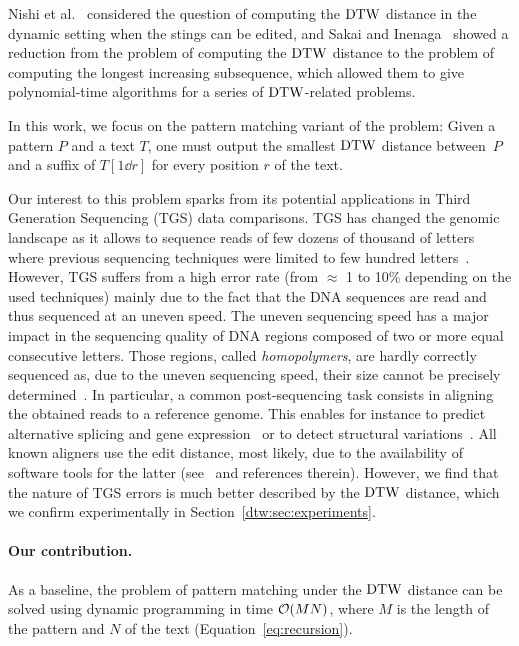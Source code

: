 Nishi et al.~\cite{DBLP:conf/spire/NishiNIBT20} considered the question of computing the $\mathrm{DTW}$ distance in the dynamic setting when the stings can be edited, and Sakai and Inenaga~\cite{DBLP:conf/isaac/SakaiI20} showed a reduction from the problem of computing the $\mathrm{DTW}$ distance to the problem of computing the longest increasing subsequence, which allowed them to give polynomial-time algorithms for a series of $\mathrm{DTW}$-related problems. 

In this work, we focus on the pattern matching variant of the problem: Given a pattern $P$ and a text $T$, one must output the smallest $\mathrm{DTW}$ distance between~$P$ and a suffix of $T[1 \dd r]$ for every position $r$ of the text. 

Our interest to this problem sparks from its potential applications in Third Generation Sequencing (TGS) data comparisons. TGS has changed the genomic landscape as it allows to sequence reads of few dozens of thousand of letters where previous sequencing techniques were limited to few hundred letters~\cite{amarasinghe2020opportunities}. However, TGS suffers from a high error rate (from $\approx$ 1 to 10\% depending on the used techniques) mainly due to the fact that the DNA sequences are read and thus sequenced at an uneven speed. The uneven sequencing speed has a major impact in the sequencing quality of DNA regions composed of two or more equal consecutive letters. Those regions, called \emph{homopolymers}, are hardly correctly sequenced as, due to the uneven sequencing speed, their size cannot be precisely determined~\cite{huang_homopolish_2021}. In particular, a common post-sequencing task  consists in aligning the obtained reads to a reference genome. This enables for instance to predict alternative splicing and gene expression~\cite{gonzalez2016introduction} or to detect structural variations~\cite{mahmoud2019structural}. All known aligners use the edit distance, most likely, due to the availability of software tools for the latter (see~\cite{10.1093/bioinformatics/bty191} and references therein). However, we find that the nature of TGS errors is much better described by the $\mathrm{DTW}$ distance, which we confirm experimentally in Section~\ref{dtw:sec:experiments}.

\paragraph{Our contribution.}  As a baseline, the problem of pattern matching under the $\mathrm{DTW}$ distance can be solved using dynamic programming in time $\mathcal{O}(MN)$, where $M$ is the length of the pattern and $N$ of the text (Equation~\ref{eq:recursion}). 

